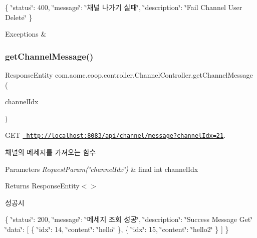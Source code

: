 \{ \char`\"{}status\char`\"{}\+: 400, \char`\"{}message\char`\"{}\+: \char`\"{}채널 나가기 실패\char`\"{}, \char`\"{}description\char`\"{}\+: \char`\"{}\+Fail Channel User Delete\char`\"{} \}


\begin{DoxyExceptions}{Exceptions}
{\em } & \\
\hline
\end{DoxyExceptions}
\mbox{\label{classcom_1_1aomc_1_1coop_1_1controller_1_1_channel_controller_a536772003bd832f07fbbf36d4ee20a33}} 
\subsubsection{\texorpdfstring{getChannelMessage()}{getChannelMessage()}}
{\footnotesize\ttfamily Response\+Entity com.\+aomc.\+coop.\+controller.\+Channel\+Controller.\+get\+Channel\+Message (\begin{DoxyParamCaption}\item[{@Request\+Param(\char`\"{}channel\+Idx\char`\"{}) final int}]{channel\+Idx }\end{DoxyParamCaption})}



G\+ET \href{http://localhost:8083/api/channel/message?channelIdx=21}{\texttt{ http\+://localhost\+:8083/api/channel/message?channel\+Idx=21}}. 

채널의 메세지를 가져오는 함수


\begin{DoxyParams}{Parameters}
{\em Request\+Param(\char`\"{}channel\+Idx\char`\"{})} & final int channel\+Idx\\
\hline
\end{DoxyParams}
\begin{DoxyReturn}{Returns}
Response\+Entity$<$$>$
\end{DoxyReturn}
성공시

\{ \char`\"{}status\char`\"{}\+: 200, \char`\"{}message\char`\"{}\+: \char`\"{}메세지 조회 성공\char`\"{}, \char`\"{}description\char`\"{}\+: \char`\"{}\+Success Message Get\char`\"{} \char`\"{}data\char`\"{}\+: \mbox{[} \{ \char`\"{}idx\char`\"{}\+: 14, \char`\"{}content\char`\"{}\+: \char`\"{}hello\char`\"{} \}, \{ \char`\"{}idx\char`\"{}\+: 15, \char`\"{}content\char`\"{}\+: \char`\"{}hello2\char`\"{} \} \mbox{]} \}

